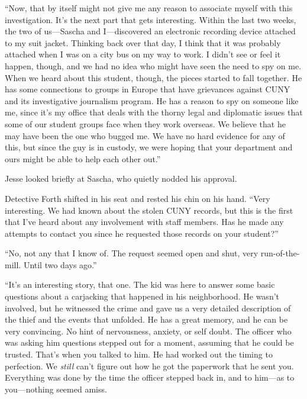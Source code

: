 \documentclass[12pt]{book}
\begin{document}
``Now, that by itself might not give me any reason to associate myself with this investigation.  It's the next part that gets interesting.  Within the last two weeks, the two of us---Sascha and I---discovered an electronic recording device attached to my suit jacket.  Thinking back over that day, I think that it was probably attached when I was on a city bus on my way to work.  I didn't see or feel it happen, though, and we had no idea who might have seen the need to spy on me.  When we heard about this student, though, the pieces started to fall together.  He has some connections to groups in Europe that have grievances against CUNY and its investigative journalism program.  He has a reason to spy on someone like me, since it's my office that deals with the thorny legal and diplomatic issues that some of our student groups face when they work overseas.  We believe that he may have been the one who bugged me.  We have no hard evidence for any of this, but since the guy is in custody, we were hoping that your department and ours might be able to help each other out.''

Jesse looked briefly at Sascha, who quietly nodded his approval.

Detective Forth shifted in his seat and rested his chin on his hand.  ``Very interesting.  We had known about the stolen CUNY records, but this is the first that I've heard about any involvement with staff members.  Has he made any attempts to contact you since he requested those records on your student?''

``No, not any that I know of.  The request seemed open and shut, very run-of-the-mill.  Until two days ago.''

``It's an interesting story, that one.  The kid was here to answer some basic questions about a carjacking that happened in his neighborhood.  He wasn't involved, but he witnessed the crime and gave us a very detailed description of the thief and the events that unfolded.  He has a great memory, and he can be very convincing.  No hint of nervousness, anxiety, or self doubt.  The officer who was asking him questions stepped out for a moment, assuming that he could be trusted.  That's when you talked to him.  He had worked out the timing to perfection.  We \emph{still} can't figure out how he got the paperwork that he sent you.  Everything was done by the time the officer stepped back in, and to him---as to you---nothing seemed amiss.
\end{document}
